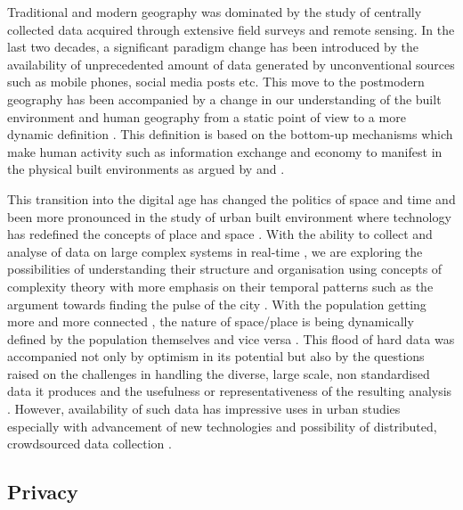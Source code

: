 Traditional and modern geography was dominated by the study of centrally collected data acquired through extensive field surveys and remote sensing.
In the last two decades, a significant paradigm change has been introduced by the availability of unprecedented amount of data generated by unconventional sources such as mobile phones, social media posts etc.
This move to the postmodern geography has been accompanied by a change in our understanding of the built environment and human geography from a static point of view to a more dynamic definition \cite{soja1989}.
This definition is based on the bottom-up mechanisms which make human activity such as information exchange and economy to manifest in the physical built environments as argued by \citep{batty1990, batty1997, batty2012} and \citep{batty2013, batty2013a}.

This transition into the digital age \citep{graham1999, tranos2012, tranos2013} has changed the politics of space and time \citep{massey1992} and been more pronounced in the study of urban built environment where technology has redefined the concepts of place and space \citep{graham2001, graham2002, sassen2001}.
With the ability to collect and analyse of data on large complex systems in real-time \citep{graham1997}, we are exploring the possibilities of understanding their structure and organisation using concepts of complexity theory \citep{bettencourt2013, portugali2012} with more emphasis on their temporal patterns such as the argument towards finding the pulse of the city \citep{batty2010}.
With the population getting more and more connected \citep{castells2010}, the nature of space/place is being dynamically defined by the population themselves \citep{giuliano1991} and vice versa \citep{zandvliet2006}.
This flood of hard data \cite[-1cm]{nature2008} was accompanied not only by optimism in its potential \citep{thomas2001} but also by the questions raised on the challenges in handling the diverse, large scale, non standardised data it produces and the usefulness or representativeness of the resulting analysis \citep{miller2010, arribas-bel2014a}.
However, availability of such data has impressive uses in urban studies \citep{bettencourt2014} especially with advancement of new technologies \citep{steenbruggen2013} and possibility of distributed, crowdsourced data collection \citep{lokanathan2015}.

\subsection{Privacy}

